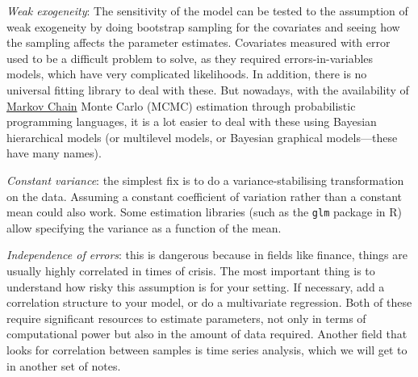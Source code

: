 \textit{Weak exogeneity}: The sensitivity of the model can be tested to the assumption of weak exogeneity by doing bootstrap sampling for the covariates and seeing how the sampling affects the parameter estimates. Covariates measured with error used to be a difficult problem to solve, as they required errors-in-variables models, which have very complicated likelihoods. In addition, there is no universal fitting library to deal with these. But nowadays, with the availability of \hyperref[sp-def:markov-chain]{Markov Chain} Monte Carlo (MCMC) estimation through probabilistic programming languages, it is a lot easier to deal with these using Bayesian hierarchical models (or multilevel models, or Bayesian graphical models---these have many names).

\textit{Constant variance}: the simplest fix is to do a variance-stabilising transformation on the data. Assuming a constant coefficient of variation rather than a constant mean could also work. Some estimation libraries (such as the \verb+glm+ package in R) allow specifying the variance as a function of the mean.

\textit{Independence of errors}: this is dangerous because in fields like finance, things are usually highly correlated in times of crisis. The most important thing is to understand how risky this assumption is for your setting. If necessary, add a correlation structure to your model, or do  a multivariate regression. Both of these require significant resources to estimate parameters, not only in terms of computational power but also in the amount of data required. Another field that looks for correlation between samples is time series analysis, which we will get to in another set of notes. 

